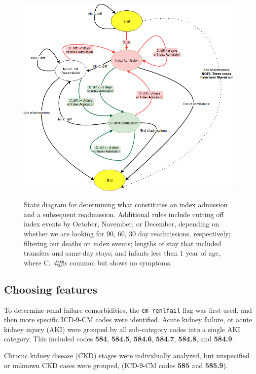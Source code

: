\documentclass[12pt]{ociamthesis}\usepackage[]{graphicx}\usepackage[]{color}
\newcommand{\cdiff}{C. \textit{diff}}
\begin{document}
\begin{figure}[h]
\centering
\includegraphics[scale=0.5]{readmission-state-diagram.png} 
\label{fig:readmission-state-diagram} 
\caption{State diagram for determining what constitutes an index admission and a subsequent readmission.
Additional rules include cutting off index events by October, November, or December, depending on whether we are looking for 90, 60, 30 day readmissions, respectively;
filtering out deaths on index events;
lengths of stay that included transfers and same-day stays;
and infants less than 1 year of age, where \cdiff is common but shows no symptoms.}
\end{figure}


\subsection{Choosing features}

To determine renal failure comorbidities, the \texttt{cm\_renlfail} flag was first used, and then more specific ICD-9-CM codes were identified. Acute kidney failure, 
or acute kidney injury (AKI) were grouped by all sub-category codes into a single AKI category. This included codes \textbf{584}, \textbf{584.5}, \textbf{584.6}, \textbf{584.7}, 
\textbf{584.8}, and \textbf{584.9}. 

Chronic kidney disease (CKD) stages were individually analyzed, but unspecified or unknown CKD cases were grouped, (ICD-9-CM codes \textbf{585} and \textbf{585.9}). 
\end{document}
